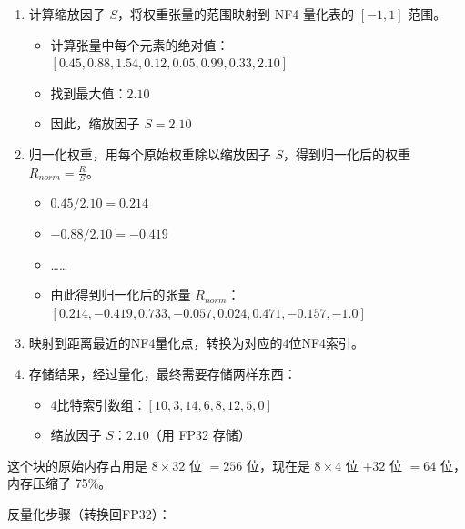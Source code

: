 \begin{enumerate}
\def\labelenumi{\arabic{enumi}.}
\item
  计算缩放因子 \(S\)，将权重张量的范围映射到 NF4 量化表的 \([-1, 1]\) 范围。

  \begin{itemize}
  \tightlist
  \item
    计算张量中每个元素的绝对值：\([0.45, 0.88, 1.54, 0.12, 0.05, 0.99, 0.33, 2.10]\)
  \item
    找到最大值：\(2.10\)
  \item
    因此，缩放因子 \(S = 2.10\)
  \end{itemize}
\item
  归一化权重，用每个原始权重除以缩放因子 \(S\)，得到归一化后的权重 \(R_{norm} = \frac{R}{S}\)。

  \begin{itemize}
  \tightlist
  \item
    \(0.45 / 2.10 = 0.214\)
  \item
    \(-0.88 / 2.10 = -0.419\)
  \item
    \ldots\ldots{}
  \item
    由此得到归一化后的张量 \(R_{norm}\)：\([0.214, -0.419, 0.733, -0.057, 0.024, 0.471, -0.157, -1.0]\)
  \end{itemize}
\item
  映射到距离最近的NF4量化点，转换为对应的4位NF4索引。
\item
  存储结果，经过量化，最终需要存储两样东西：

  \begin{itemize}
  \tightlist
  \item
    4比特索引数组：\([10, 3, 14, 6, 8, 12, 5, 0]\)
  \item
    缩放因子 \(S\)：\(2.10\)（用 FP32 存储）
  \end{itemize}
\end{enumerate}

这个块的原始内存占用是 \(8 \times 32\) 位 \(= 256\) 位，现在是 \(8 \times 4\) 位 \(+ 32\) 位 \(= 64\) 位，内存压缩了 75\%。

反量化步骤（转换回FP32）：

